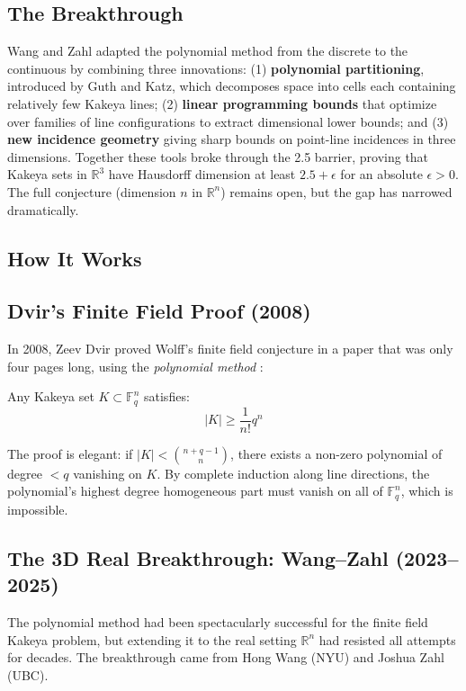\subsection{The Breakthrough}
Wang and Zahl adapted the polynomial method from the discrete to the continuous by combining three innovations: (1) \textbf{polynomial partitioning}, introduced by Guth and Katz, which decomposes space into cells each containing relatively few Kakeya lines; (2) \textbf{linear programming bounds} that optimize over families of line configurations to extract dimensional lower bounds; and (3) \textbf{new incidence geometry} giving sharp bounds on point-line incidences in three dimensions. Together these tools broke through the 2.5 barrier, proving that Kakeya sets in $\mathbb{R}^3$ have Hausdorff dimension at least $2.5 + \epsilon$ for an absolute $\epsilon > 0$. The full conjecture (dimension $n$ in $\mathbb{R}^n$) remains open, but the gap has narrowed dramatically.

\subsection{How It Works}

\subsection{Dvir's Finite Field Proof (2008)}
In 2008, Zeev Dvir proved Wolff's finite field conjecture in a paper that was only four pages long, using the \emph{polynomial method} \cite{dvir2009}:

\begin{theorem}
Any Kakeya set $K \subset \mathbb{F}_q^n$ satisfies:
\begin{equation}
|K| \geq \frac{1}{n!} q^n
\end{equation}
\end{theorem}

The proof is elegant: if $|K| < \binom{n+q-1}{n}$, there exists a non-zero polynomial of degree $<q$ vanishing on $K$. By complete induction along line directions, the polynomial's highest degree homogeneous part must vanish on all of $\mathbb{F}_q^n$, which is impossible.

\subsection{The 3D Real Breakthrough: Wang--Zahl (2023--2025)}

The polynomial method had been spectacularly successful for the finite field Kakeya problem, but extending it to the real setting $\mathbb{R}^n$ had resisted all attempts for decades. The breakthrough came from Hong Wang (NYU) and Joshua Zahl (UBC).

